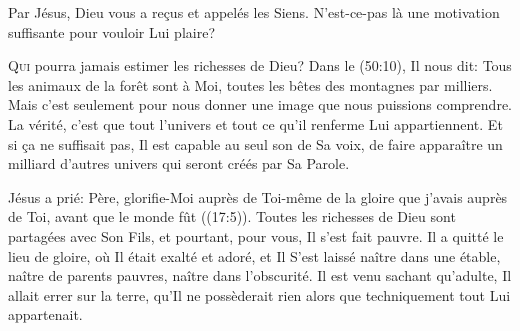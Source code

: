 Par Jésus, Dieu vous a re\c{c}us et appelés les Siens.
 N'est-ce-pas là une motivation suffisante pour vouloir Lui plaire?

\dvrule







\lettrine{Q}{ui} pourra jamais estimer les richesses de Dieu?
 Dans le (50:10), Il nous dit: 
 \Og Tous les animaux de la forêt sont à Moi,
 toutes les bêtes des montagnes par milliers. \Fg{}
 Mais c'est seulement pour nous donner une image que nous puissions comprendre.
 La vérité, c'est que tout l'univers et tout ce qu'il renferme
 Lui appartiennent. Et si \c{c}a ne suffisait pas, Il est capable au seul son
 de Sa voix, de faire apparaître un milliard d'autres univers
 qui seront créés par Sa Parole.

Jésus a prié: 
 \Og Père, glorifie-Moi auprès de Toi-même de la gloire
 que j'avais auprès de Toi, avant que le monde fût \Fg{}
 ((17:5)).
 Toutes les richesses de Dieu sont partagées avec Son Fils, et pourtant,
 pour vous, Il s'est fait pauvre. Il a quitté le lieu de gloire,
 où Il était exalté et adoré, et Il S'est laissé naître dans une étable,
 naître de parents pauvres, naître dans l'obscurité.
 Il est venu sachant qu'adulte, Il allait errer sur la terre,
 qu'Il ne possèderait rien alors que techniquement tout Lui appartenait.


